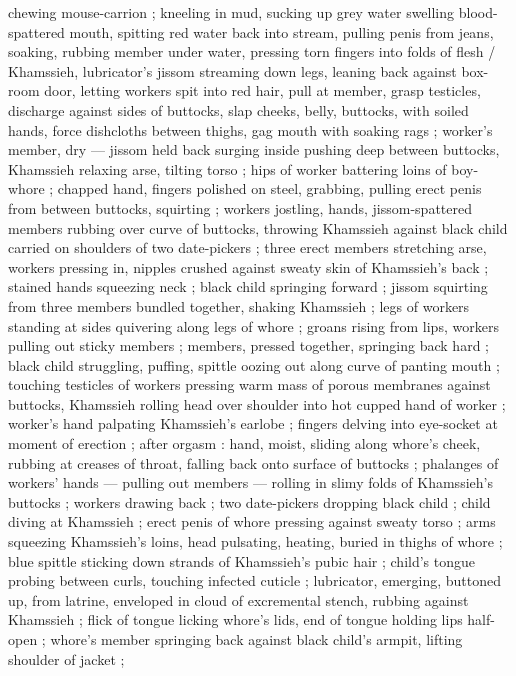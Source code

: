 chewing %
mouse-carrion ; kneeling in mud, sucking up grey water swelling blood-spattered mouth, spitting red
water back into stream, pulling penis from jeans, soaking, rubbing member under water, pressing torn
fingers into folds of flesh{\thd} {\slash} Khamssieh, lubricator's jissom streaming down legs,
leaning back against box-room door, letting workers spit into red hair, pull at member, grasp
testicles, discharge against sides of buttocks, slap cheeks, belly, buttocks, with soiled hands,
force dishcloths between thighs, gag mouth with soaking rags ; worker's member, dry --- jissom held
back surging inside {\dashcom} pushing deep between buttocks, Khamssieh relaxing arse, tilting torso
; hips of worker battering loins of boy-whore ; chapped hand, fingers polished on steel, grabbing,
pulling erect penis from between buttocks, squirting ; workers jostling, hands, jissom-spattered
members rubbing over curve of buttocks, throwing Khamssieh against black child carried on shoulders
of two date-pickers ; three erect members stretching arse, workers pressing in, nipples crushed
against sweaty skin of Khamssieh's back ; stained hands squeezing neck ; black child springing
forward ; jissom squirting from three members bundled together, shaking Khamssieh ; legs of workers
standing at sides quivering along legs of whore ; groans rising from lips, workers pulling out
sticky members ; members, pressed together, springing back hard ; black child struggling, puffing,
spittle oozing out along curve of panting mouth ; touching testicles of workers pressing warm mass
of porous membranes against buttocks, Khamssieh rolling head over shoulder into hot cupped hand of
worker ; worker's hand palpating Khamssieh's earlobe ; fingers delving into eye-socket at moment of
erection ; after orgasm : hand, moist, sliding along whore's cheek, rubbing at creases of throat,
falling back onto surface of buttocks ; phalanges of workers' hands --- pulling out members ---
rolling in slimy folds of Khamssieh's buttocks ; workers drawing back ; two date-pickers dropping
black child ; child diving at Khamssieh ; erect penis of whore pressing against sweaty torso ; arms
squeezing Khamssieh's loins, head pulsating, heating, buried in thighs of whore ; blue spittle
sticking %
down strands of Khamssieh's pubic hair ; child's tongue probing between curls, touching infected
cuticle ; lubricator, emerging, buttoned up, from latrine, enveloped in cloud of excremental stench,
rubbing against Khamssieh ; flick of tongue licking whore's lids, end of tongue holding lips
half-open ; whore's member springing back against black child's armpit, lifting shoulder of jacket ;
